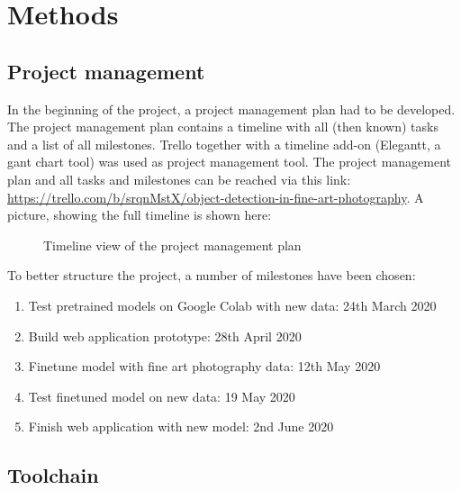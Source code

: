 \chapter{Methods}

\section{Project management}

In the beginning of the project, a project management plan had to be developed. The project management plan contains a timeline with all (then known) tasks and a list of all milestones. Trello together with a timeline add-on (Elegantt, a gant chart tool) was used as project management tool. The project management plan and all tasks and milestones can be reached via this link: \url{https://trello.com/b/srqnMstX/object-detection-in-fine-art-photography}. A picture, showing the full timeline is shown here:

 \begin{figure}[H]
	\caption{\label{fig:project-management-plan} Timeline view of the project management plan}
\end{figure}

To better structure the project, a number of milestones have been chosen:

\begin{enumerate}
	\item Test pretrained models on Google Colab with new data: 24th March 2020
	\item Build web application prototype: 28th April 2020
	\item Finetune model with fine art photography data: 12th May 2020
	\item Test finetuned model on new data: 19 May 2020
	\item Finish web application with new model: 2nd June 2020
\end{enumerate}

\section{Toolchain}

